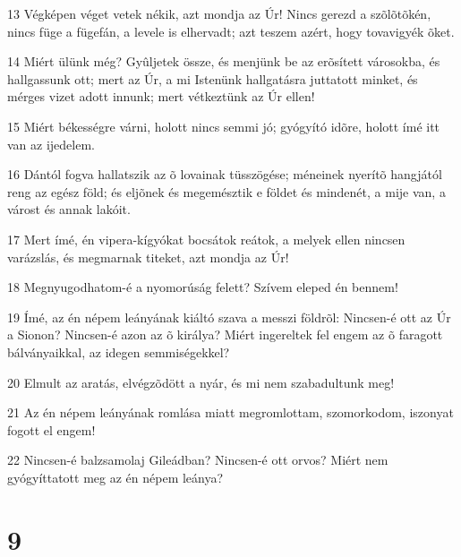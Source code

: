 \par 13 Végképen véget vetek nékik, azt mondja az Úr! Nincs gerezd a szõlõtõkén, nincs füge a fügefán, a levele is elhervadt; azt teszem azért, hogy tovavigyék õket.
\par 14 Miért ülünk még? Gyûljetek össze, és menjünk be az erõsített városokba, és hallgassunk ott; mert az Úr, a mi Istenünk hallgatásra juttatott minket, és mérges vizet adott innunk; mert vétkeztünk az Úr ellen!
\par 15 Miért békességre várni, holott nincs semmi jó; gyógyító idõre, holott ímé itt van az ijedelem.
\par 16 Dántól fogva hallatszik az õ lovainak tüsszögése; méneinek nyerítõ hangjától reng az egész föld; és eljõnek és megemésztik e földet és mindenét, a mije van, a várost és annak lakóit.
\par 17 Mert ímé, én vipera-kígyókat bocsátok reátok, a melyek ellen nincsen varázslás, és megmarnak titeket, azt mondja az Úr!
\par 18 Megnyugodhatom-é a nyomorúság felett? Szívem eleped én bennem!
\par 19 Ímé, az én népem leányának kiáltó szava a messzi földrõl: Nincsen-é ott az Úr a Sionon? Nincsen-é azon az õ királya? Miért ingereltek fel engem az õ faragott bálványaikkal, az idegen semmiségekkel?
\par 20 Elmult az aratás, elvégzõdött a nyár, és mi nem szabadultunk meg!
\par 21 Az én népem leányának romlása miatt megromlottam, szomorkodom, iszonyat fogott el engem!
\par 22 Nincsen-é balzsamolaj Gileádban? Nincsen-é ott orvos? Miért nem gyógyíttatott meg az én népem leánya?

\chapter{9}

